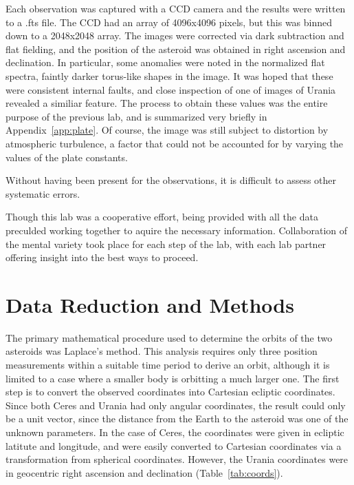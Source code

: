 \documentclass[a4paper,12pt]{article}
\begin{document}
Each observation was captured with a CCD camera and the results were written to a .fts file. The CCD had an array of 4096x4096 pixels, but this was binned down to a 2048x2048 array. The images were corrected via dark subtraction and flat fielding, and the position of the asteroid was obtained in right ascension and declination. In particular, some anomalies were noted in the normalized flat spectra, faintly darker torus-like shapes in the image. It was hoped that these were consistent internal faults, and close inspection of one of images of Urania revealed a similiar feature.  The process to obtain these values was the entire purpose of the previous lab, and is summarized very briefly in Appendix~\ref{app:plate}. Of course, the image was still subject to distortion by atmospheric turbulence, a factor that could not be accounted for by varying the values of the plate constants.

Without having been present for the observations, it is difficult to assess other systematic errors.

Though this lab was a cooperative effort, being provided with all the data preculded working together to aquire the necessary information. Collaboration of the mental variety took place for each step of the lab, with each lab partner offering insight into the best ways to proceed.



\section{Data Reduction and Methods}
\label{sec:data}

The primary mathematical procedure used to determine the orbits of the two asteroids was Laplace's method. This analysis requires only three position measurements within a suitable time period to derive an orbit, although it is limited to a case where a smaller body is orbitting a much larger one. The first step is to convert the observed coordinates into Cartesian ecliptic coordinates. Since both Ceres and Urania had only angular coordinates, the result could only be a unit vector, since the distance from the Earth to the asteroid was one of the unknown parameters. In the case of Ceres, the coordinates were given in ecliptic latitute and longitude, and were easily converted to Cartesian coordinates via a transformation from spherical coordinates. However, the Urania coordinates were in geocentric right ascension and declination (Table~\ref{tab:coords}).
\end{document}
